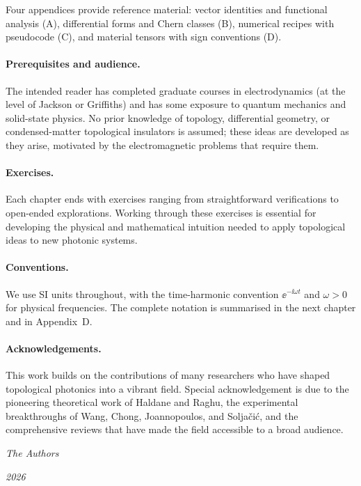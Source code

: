 Four appendices provide reference material: vector identities and
functional analysis (A), differential forms and Chern classes (B),
numerical recipes with pseudocode (C), and material tensors with sign
conventions (D).

\paragraph{Prerequisites and audience.}

The intended reader has completed graduate courses in electrodynamics
(at the level of Jackson or Griffiths) and has some exposure to
quantum mechanics and solid-state physics.  No prior knowledge of
topology, differential geometry, or condensed-matter topological
insulators is assumed; these ideas are developed as they arise,
motivated by the electromagnetic problems that require them.

\paragraph{Exercises.}

Each chapter ends with exercises ranging from straightforward
verifications to open-ended explorations.  Working through these
exercises is essential for developing the physical and mathematical
intuition needed to apply topological ideas to new photonic systems.

\paragraph{Conventions.}

We use SI units throughout, with the time-harmonic convention
$\ee^{-\ii\omega t}$ and $\omega>0$ for physical frequencies.  The
complete notation is summarised in the next chapter and in Appendix~D.

\paragraph{Acknowledgements.}

This work builds on the contributions of many researchers who have
shaped topological photonics into a vibrant field.  Special
acknowledgement is due to the pioneering theoretical work of Haldane
and Raghu, the experimental breakthroughs of Wang, Chong, Joannopoulos,
and Solja\v{c}i\'{c}, and the comprehensive reviews that have made the
field accessible to a broad audience.

\vspace{1cm}

\hfill\emph{The Authors}

\hfill\emph{2026}
